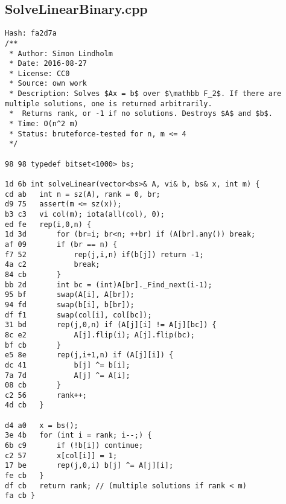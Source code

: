 \documentclass[11pt, a4paper, twoside]{article}
\begin{document}
\subsection{SolveLinearBinary.cpp}
\begin{lstlisting}
Hash: fa2d7a
/**
 * Author: Simon Lindholm
 * Date: 2016-08-27
 * License: CC0
 * Source: own work
 * Description: Solves $Ax = b$ over $\mathbb F_2$. If there are multiple solutions, one is returned arbitrarily.
 *  Returns rank, or -1 if no solutions. Destroys $A$ and $b$.
 * Time: O(n^2 m)
 * Status: bruteforce-tested for n, m <= 4
 */

98 98 typedef bitset<1000> bs;

1d 6b int solveLinear(vector<bs>& A, vi& b, bs& x, int m) {
cd ab 	int n = sz(A), rank = 0, br;
d9 75 	assert(m <= sz(x));
b3 c3 	vi col(m); iota(all(col), 0);
ed fe 	rep(i,0,n) {
1d 3d 		for (br=i; br<n; ++br) if (A[br].any()) break;
af 09 		if (br == n) {
f7 52 			rep(j,i,n) if(b[j]) return -1;
4a c2 			break;
84 cb 		}
bb 2d 		int bc = (int)A[br]._Find_next(i-1);
95 bf 		swap(A[i], A[br]);
94 fd 		swap(b[i], b[br]);
df f1 		swap(col[i], col[bc]);
31 bd 		rep(j,0,n) if (A[j][i] != A[j][bc]) {
8c e2 			A[j].flip(i); A[j].flip(bc);
bf cb 		}
e5 8e 		rep(j,i+1,n) if (A[j][i]) {
dc 41 			b[j] ^= b[i];
7a 7d 			A[j] ^= A[i];
08 cb 		}
c2 56 		rank++;
4d cb 	}
      
d4 a0 	x = bs();
3e 4b 	for (int i = rank; i--;) {
6b c9 		if (!b[i]) continue;
c2 57 		x[col[i]] = 1;
17 be 		rep(j,0,i) b[j] ^= A[j][i];
fe cb 	}
df cb 	return rank; // (multiple solutions if rank < m)
fa cb }
\end{lstlisting}
\end{document}
